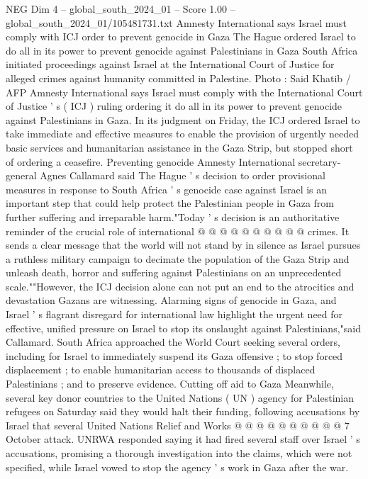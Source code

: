 \begin{textsample}{NEG Dim 4 – global\_south\_2024\_01 – Score 1.00 – global\_south\_2024\_01/105481731.txt}  \label{ex:f4_neg_087}
Amnesty International says Israel must comply with ICJ order to prevent genocide in Gaza The Hague ordered Israel to do all in its power to prevent genocide against Palestinians in Gaza South Africa initiated proceedings against Israel at the International Court of Justice for alleged crimes against humanity committed in Palestine.
Photo : Said Khatib / AFP Amnesty International says Israel must comply with the International Court of Justice ' s ( ICJ ) ruling ordering it do all in its power to prevent genocide against Palestinians in Gaza.
In its judgment on Friday, the ICJ ordered Israel to take immediate and effective measures to enable the provision of urgently needed basic services and humanitarian assistance in the Gaza Strip, but stopped short of ordering a ceasefire.
Preventing genocide Amnesty International secretary-general Agnes Callamard said The Hague ' s decision to order provisional measures in response to South Africa ' s genocide case against Israel is an important step that could help protect the Palestinian people in Gaza from further suffering and irreparable harm."Today ' s decision is an authoritative reminder of the crucial role of international @ @ @ @ @ @ @ @ @ @ crimes.
It sends a clear message that the world will not stand by in silence as Israel pursues a ruthless military campaign to decimate the population of the Gaza Strip and unleash death, horror and suffering against Palestinians on an unprecedented scale.""However, the ICJ decision alone can not put an end to the atrocities and devastation Gazans are witnessing.
Alarming signs of genocide in Gaza, and Israel ' s flagrant disregard for international law highlight the urgent need for effective, unified pressure on Israel to stop its onslaught against Palestinians,"said Callamard.
South Africa approached the World Court seeking several orders, including for Israel to immediately suspend its Gaza offensive ; to stop forced displacement ; to enable humanitarian access to thousands of displaced Palestinians ; and to preserve evidence.
Cutting off aid to Gaza Meanwhile, several key donor countries to the United Nations ( UN ) agency for Palestinian refugees on Saturday said they would halt their funding, following accusations by Israel that several United Nations Relief and Works @ @ @ @ @ @ @ @ @ @ 7 October attack.
UNRWA responded saying it had fired several staff over Israel ' s accusations, promising a thorough investigation into the claims, which were not specified, while Israel vowed to stop the agency ' s work in Gaza after the war.

\end{textsample}
